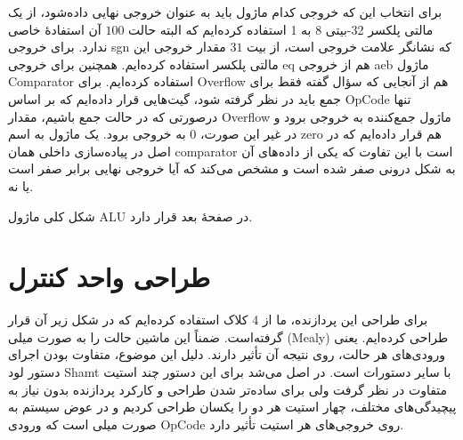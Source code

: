 \documentclass[12pt,titlepage,a4page , tikz , multi,table , svgnames,xcdraw]{article}
\begin{document}
برای انتخاب این که خروجی کدام ماژول باید به عنوان خروجی نهایی داده‌شود، از یک مالتی پلکسر 32-بیتی 8 به 1 استفاده کرده‌ایم که البته حالت $100$ آن استفادهٔ خاصی ندارد. برای خروجی sgn که نشانگر علامت خروجی است، از بیت $31$ مقدار خروجی این مالتی پلکسر استفاده کرده‌ایم. همچنین برای خروجی eq هم از خروجی aeb ماژول Comparator استفاده کرده‌ایم. برای Overflow هم از آنجایی که سؤال گفته فقط برای جمع باید در نظر گرفته شود، گیت‌هایی قرار داده‌ایم که بر اساس OpCode تنها درصورتی که در حالت جمع باشیم، مقدار Overflow ماژول جمع‌کننده به خروجی برود و در غیر این صورت، $0$ به خروجی برود. یک ماژول به اسم zero هم قرار داده‌ایم که در اصل در پیاده‌سازی داخلی همان comparator است با این تفاوت که یکی از داده‌های آن به شکل درونی صفر شده است و مشخص می‌کند که آیا خروجی نهایی برابر صفر است یا نه.

شکل کلی ماژول ALU در صفحهٔ بعد قرار دارد.




\begin{landscape}

\thispagestyle{empty}




\end{landscape}




\section{طراحی واحد کنترل}

برای طراحی این پردازنده، ما از 4 کلاک استفاده کرده‌ایم که در شکل زیر  آن قرار گرفته‌است. ضمناً این ماشین حالت را به صورت میلی (Mealy) طراحی کرده‌ایم. یعنی ورودی‌های هر حالت، روی نتیجه آن تأثیر دارند. دلیل این موضوع، متفاوت بودن اجرای دستور لود Shamt با سایر دستورات است. در اصل می‌شد برای این دستور چند استیت متفاوت در نظر گرفت ولی برای ساده‌تر شدن طراحی و کارکرد پردازنده بدون نیاز به پیچیدگی‌های مختلف، چهار استیت هر دو را یکسان طراحی کردیم و در عوض سیستم به صورت میلی است که ورودی OpCode روی خروجی‌های هر استیت تأثیر دارد.
\end{document}
